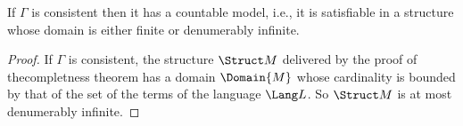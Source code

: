 \documentclass[../../include/open-logic-section]{subfiles}
\begin{document}

\begin{thm} 
If $\Gamma$ is consistent then it has a countable model, i.e., it is
satisfiable in a structure whose domain is either finite or
denumerably infinite.
\end{thm}

\begin{proof}
  If $\Gamma$ is consistent, the structure $\Struct M$ delivered by
  the proof of thecompletness theorem has a domain $\Domain{M}$ whose
  cardinality is bounded by that of the set of the terms of the
  language $\Lang L$. So $\Struct M$ is at most denumerably infinite.
\end{proof}
\end{document}
